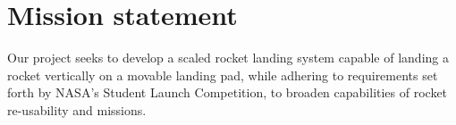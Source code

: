 \clearpage
\section{Mission statement}
Our project seeks to develop a scaled rocket landing system capable of landing a rocket
vertically on a movable landing pad, while adhering to requirements set forth by NASA’s
Student Launch Competition, to broaden capabilities of rocket re-usability and missions.
